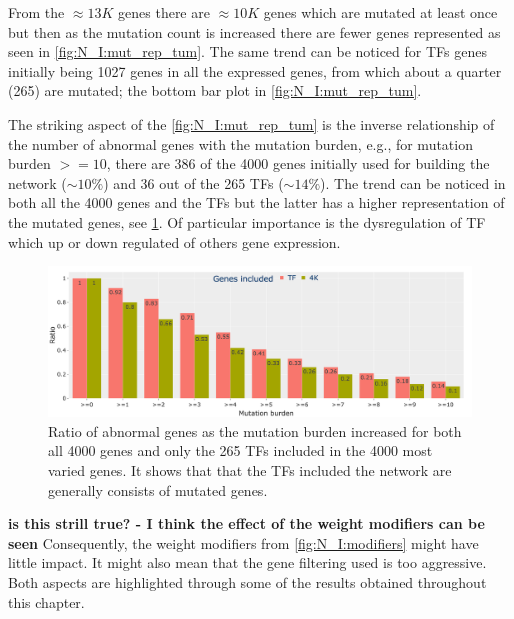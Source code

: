 From the $\approx13K$ genes there are $\approx10K$ genes which are mutated at least once but then as the mutation count is increased there are fewer genes represented as seen in \cref{fig:N_I:mut_rep_tum}. The same trend can be noticed for TFs genes initially being 1027 genes in all the expressed genes, from which about a quarter (265) are mutated; the bottom bar plot in \cref{fig:N_I:mut_rep_tum}.

The striking aspect of the \cref{fig:N_I:mut_rep_tum} is the inverse relationship of the number of abnormal genes with the mutation burden, e.g., for mutation burden $>=10$, there are 386 of the 4000 genes initially used for building the network ($\sim10\%$) and 36 out of the 265 TFs ($\sim14\%$). The trend can be noticed in both all the 4000 genes and the TFs but the latter has a higher representation of the mutated genes, see \cref{fig:N_I:prct_mut_rep_tum}. Of particular importance is the dysregulation of TF which up or down regulated of others gene expression.

\begin{figure}[!htb]    
    \centering
    \includegraphics[width=1.0\textwidth,keepaspectratio]{Sections/Network_I/Resources/Tum_network/MutTF_representation_4K_TF_prct.png}
    \caption{Ratio of abnormal genes as the mutation burden increased for both all 4000 genes and only the 265 TFs included in the 4000 most varied genes. It shows that that the TFs included the network are generally consists of mutated genes.}
    \label{fig:N_I:prct_mut_rep_tum}
\end{figure}

\textbf{is this strill true? - I think the effect of the weight modifiers can be seen}
Consequently, the weight modifiers from  \cref{fig:N_I:modifiers} might have little impact. It might also mean that the gene filtering used is too aggressive. Both aspects are highlighted through some of the results obtained throughout this chapter.

